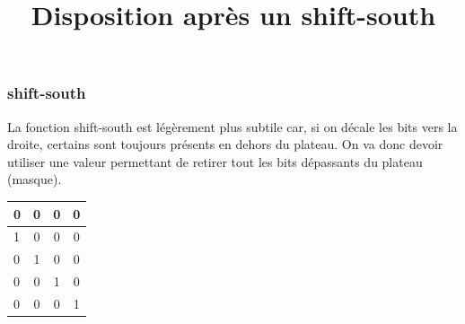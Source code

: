 \documentclass{report}
\begin{document}
\subsubsection{shift-south}

La fonction shift-south est légèrement plus subtile car, si on décale les bits vers la droite, certains sont toujours présents en dehors du plateau. On va donc devoir utiliser une valeur permettant de retirer tout les bits dépassants du plateau (masque).

\begin{center}
\renewcommand{\arraystretch} {1.5}
    \begin{tabular}{|p{0.2cm}|c|c|c|}
        \hline
        0 & 0 & 0 & 0\\
        \hline
        1 & 0 & 0 & 0 \\
        \hline
        0 & 1 & 0 & 0 \\
        \hline
        0 & 0 & 1 & 0 \\
        \hline
        0 & 0 & 0 & 1 \\
    \end{tabular}

\end{center}
\begin{center}
        \title{Disposition après un shift-south}
\end{center}
\end{document}
